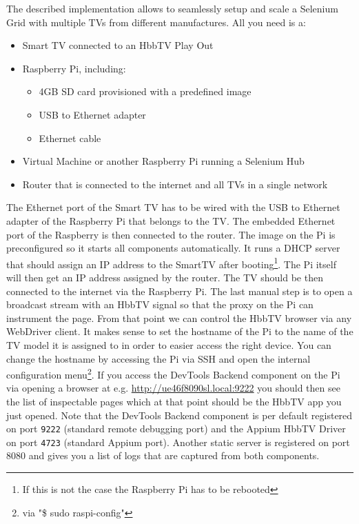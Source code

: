 The described implementation allows to seamlessly setup and scale a Selenium Grid with multiple TVs from different manufactures. All you need is a:

\begin{itemize}
  \item Smart TV connected to an HbbTV Play Out
  \item Raspberry Pi, including:
    \begin{itemize}
      \item 4GB SD card provisioned with a predefined image
      \item USB to Ethernet adapter
      \item Ethernet cable
    \end{itemize}
  \item Virtual Machine or another Raspberry Pi running a Selenium Hub
  \item Router that is connected to the internet and all TVs in a single network
\end{itemize}

The Ethernet port of the Smart TV has to be wired with the USB to Ethernet adapter of the Raspberry Pi that belongs to the TV. The embedded Ethernet port of the Raspberry is then connected to the router. The image on the Pi is preconfigured so it starts all components automatically. It runs a DHCP server that should assign an IP address to the SmartTV after booting\footnote{If this is not the case the Raspberry Pi has to be rebooted}. The Pi itself will then get an IP address assigned by the router. The TV should be then connected to the internet via the Raspberry Pi. The last manual step is to open a broadcast stream with an HbbTV signal so that the proxy on the Pi can instrument the page. From that point we can control the HbbTV browser via any WebDriver client. It makes sense to set the hostname of the Pi to the name of the TV model it is assigned to in order to easier access the right device. You can change the hostname by accessing the Pi via SSH and open the internal configuration menu\footnote{via "\$ sudo raspi-config"}. If you access the DevTools Backend component on the Pi via opening a browser at e.g. \url{http://ue46f8090sl.local:9222} you should then see the list of inspectable pages which at that point should be the HbbTV app you just opened. Note that the DevTools Backend component is per default registered on port \texttt{9222} (standard remote debugging port) and the Appium HbbTV Driver on port \texttt{4723} (standard Appium port). Another static server is registered on port 8080 and gives you a list of logs that are captured from both components.

